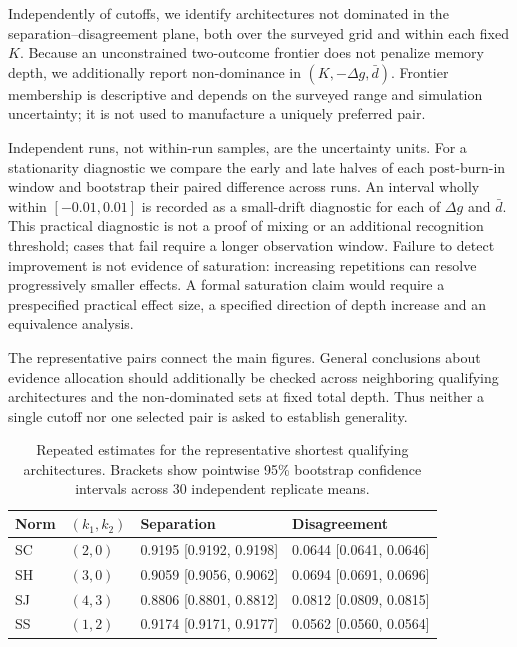 \documentclass[fleqn,10pt]{wlscirep}
\begin{document}
Independently of cutoffs, we identify architectures not dominated in the separation--disagreement plane, both over the surveyed grid and within each fixed $K$. Because an unconstrained two-outcome frontier does not penalize memory depth, we additionally report non-dominance in $(K,-\Delta g,\bar d)$. Frontier membership is descriptive and depends on the surveyed range and simulation uncertainty; it is not used to manufacture a uniquely preferred pair.

Independent runs, not within-run samples, are the uncertainty units. For a stationarity diagnostic we compare the early and late halves of each post-burn-in window and bootstrap their paired difference across runs. An interval wholly within $[-0.01,0.01]$ is recorded as a small-drift diagnostic for each of $\Delta g$ and $\bar d$. This practical diagnostic is not a proof of mixing or an additional recognition threshold; cases that fail require a longer observation window. Failure to detect improvement is not evidence of saturation: increasing repetitions can resolve progressively smaller effects. A formal saturation claim would require a prespecified practical effect size, a specified direction of depth increase and an equivalence analysis.

The representative pairs connect the main figures. General conclusions about evidence allocation should additionally be checked across neighboring qualifying architectures and the non-dominated sets at fixed total depth. Thus neither a single cutoff nor one selected pair is asked to establish generality.


\begin{table}[htbp]
\centering\small
\caption{Repeated estimates for the representative shortest qualifying architectures. Brackets show pointwise 95\% bootstrap confidence intervals across 30 independent replicate means.}
\label{tab:si-revalidated-architectures}
\begin{tabular}{llll}\toprule
Norm & $(k_1,k_2)$ & Separation & Disagreement\\\midrule
SC & $(2,0)$ & 0.9195 [0.9192, 0.9198] & 0.0644 [0.0641, 0.0646] \\
SH & $(3,0)$ & 0.9059 [0.9056, 0.9062] & 0.0694 [0.0691, 0.0696] \\
SJ & $(4,3)$ & 0.8806 [0.8801, 0.8812] & 0.0812 [0.0809, 0.0815] \\
SS & $(1,2)$ & 0.9174 [0.9171, 0.9177] & 0.0562 [0.0560, 0.0564] \\
\bottomrule\end{tabular}
\end{table}
\end{document}
